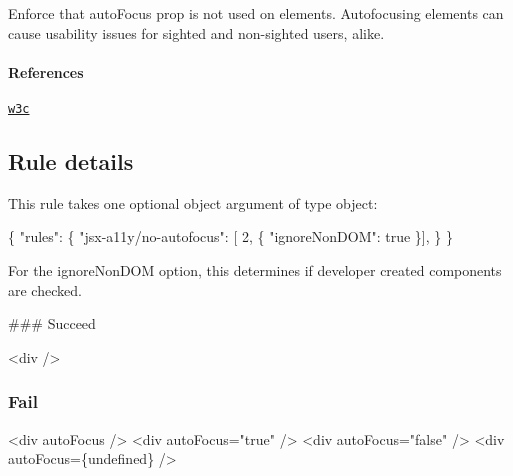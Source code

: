 Enforce that auto\+Focus prop is not used on elements. Autofocusing elements can cause usability issues for sighted and non-\/sighted users, alike.

\paragraph*{References}


\begin{DoxyEnumerate}
\item \href{https://w3c.github.io/html/sec-forms.html#autofocusing-a-form-control-the-autofocus-attribute}{\tt w3c}
\end{DoxyEnumerate}

\subsection*{Rule details}

This rule takes one optional object argument of type object\+:


\begin{DoxyCode}
\{
    "rules": \{
        "jsx-a11y/no-autofocus": [ 2, \{
            "ignoreNonDOM": true
        \}],
    \}
\}
\end{DoxyCode}


For the {\ttfamily ignore\+Non\+D\+OM} option, this determines if developer created components are checked.

\#\#\# Succeed 
\begin{DoxyCode}
<div />
\end{DoxyCode}


\subsubsection*{Fail}


\begin{DoxyCode}
<div autoFocus />
<div autoFocus="true" />
<div autoFocus="false" />
<div autoFocus=\{undefined\} />
\end{DoxyCode}
 